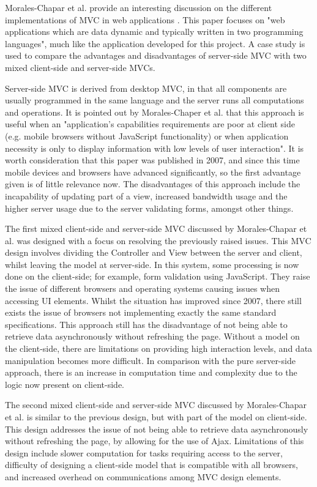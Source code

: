 \documentclass[authoryearcitations]{UoYCSproject}
\begin{document}
Morales-Chapar et al. provide an interesting discussion on the different implementations of MVC in web applications \citep{Morales-Chaparro2007}. This paper focuses on "web applications which are data dynamic and typically written in two programming languages", much like the application developed for this project. A case study is used to compare the advantages and disadvantages of server-side MVC with two mixed client-side and server-side MVCs. 

Server-side MVC is derived from desktop MVC, in that all components are usually programmed in the same language and the server runs all computations and operations. It is pointed out by Morales-Chaper et al. that this approach is useful when an "application's capabilities requirements are poor at client side (e.g. mobile browsers without JavaScript functionality) or when application necessity is only to display information with low levels of user interaction". It is worth consideration that this paper was published in 2007, and since this time mobile devices and browsers have advanced significantly, so the first advantage given is of little relevance now. The disadvantages of this approach include the incapability of updating part of a view, increased bandwidth usage and the higher server usage due to the server validating forms, amongst other things.  

The first mixed client-side and server-side MVC discussed by Morales-Chapar et al. was designed with a focus on resolving the previously raised issues. This MVC design involves dividing the Controller and View between the server and client, whilst leaving the model at server-side. In this system, some processing is now done on the client-side; for example, form validation using JavaScript. They raise the issue of different browsers and operating systems causing issues when accessing UI elements. Whilst the situation has improved since 2007, there still exists the issue of browsers not implementing exactly the same standard specifications. This approach still has the disadvantage of not being able to retrieve data asynchronously without refreshing the page. Without a model on the client-side, there are limitations on providing high interaction levels, and data manipulation becomes more difficult. In comparison with the pure server-side approach, there is an increase in computation time and complexity due to the logic now present on client-side. 

The second mixed client-side and server-side MVC discussed by Morales-Chapar et al. is similar to the previous design, but with part of the model on client-side. This design addresses the issue of not being able to retrieve data asynchronously without refreshing the page, by allowing for the use of Ajax. Limitations of this design include slower computation for tasks requiring access to the server, difficulty of designing a client-side model that is compatible with all browsers, and increased overhead on communications among MVC design elements. 
\end{document}
